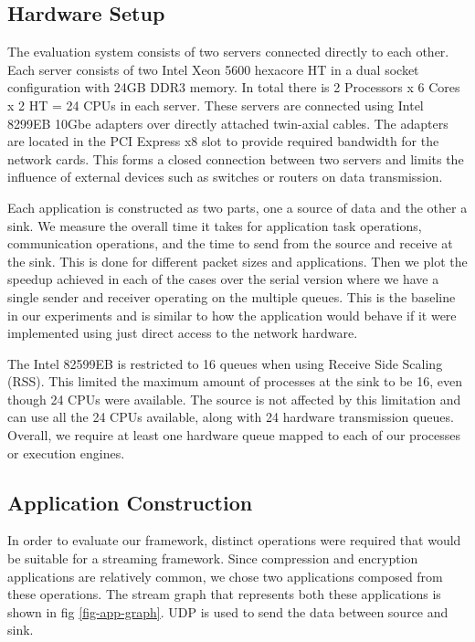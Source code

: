 \documentclass[10pt, conference, compsocconf, reqno]{IEEEtran}
\newcommand{\comment}[1]{}
\begin{document}
\subsection{Hardware Setup}

The evaluation system consists of two servers connected directly to each other. Each server consists of two Intel Xeon 5600 hexacore HT in a dual socket configuration with 24GB DDR3 memory. In total there is 2 Processors x 6 Cores x 2 HT = 24 CPUs in each server. These servers are connected using Intel 8299EB 10Gbe adapters over directly attached twin-axial cables. The adapters are located in the PCI Express x8 slot to provide required bandwidth for the network cards. This forms a closed connection between two servers and limits the influence of external devices such as switches or routers on data transmission.

Each application is constructed as two parts, one a source of data and the other a sink. We measure the overall time it takes for application task operations, communication operations, and the time to send from the source and receive at the sink. This is done for different packet sizes and applications. Then we plot the speedup achieved in each of the cases over the serial version where we have a single sender and receiver operating on the multiple queues. This is the baseline in our experiments and is similar to how the application would behave if it were implemented using just direct access to the network hardware.

The Intel 82599EB is restricted to 16 queues when using Receive Side Scaling (RSS). This limited the maximum amount of processes at the sink to be 16, even though 24 CPUs were available. The source is not affected by this limitation and can use all the 24 CPUs available, along with 24 hardware transmission queues. Overall, we require at least one hardware queue mapped to each of our processes or execution engines. \comment{We also ensure that each of the processes are bound to a particular CPU by issuing affinity calls to the OS to ensure that they are not migrated between different cores.}

\subsection{Application Construction}
\label{app-const}

In order to evaluate our framework, distinct operations were required that would be suitable for a streaming framework. Since compression and encryption applications are relatively common, we chose two applications composed from these operations. The stream graph that represents both these applications is shown in fig \ref{fig-app-graph}. UDP is used to send the data between source and sink.
\end{document}
